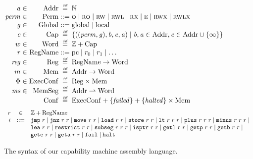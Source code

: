 \documentclass[format=acmsmall, review=true, screen=true]{acmart}
\newcommand{\parfun}{\rightharpoonup}
\newcommand{\var}[1]{\mathit{#1}}
\newcommand{\hs}{\var{ms}}
\newcommand{\ms}{\hs}
\newcommand{\hv}{\var{r}}
\newcommand{\rv}{\var{r}}
\newcommand{\lv}{\var{r}}
\newcommand{\gl}{\var{g}}
\newcommand{\pcreg}{\mathrm{pc}}
\newcommand{\addr}{\var{a}}
\newcommand{\start}{\var{b}}
\newcommand{\addrend}{\var{e}}
\newcommand{\reg}{\var{reg}}
\newcommand{\perm}{\var{perm}}
\newcommand{\failed}{\mathit{failed}}
\newcommand{\halted}{\mathit{halted}}
\newcommand{\plaindom}[1]{\mathrm{#1}}
\newcommand{\Caps}{\plaindom{Cap}}
\newcommand{\Words}{\plaindom{Word}}
\newcommand{\Addrs}{\plaindom{Addr}}
\newcommand{\ExecConfs}{\plaindom{ExecConf}}
\newcommand{\RegName}{\plaindom{RegName}}
\newcommand{\Regs}{\plaindom{Reg}}
\newcommand{\Heaps}{\plaindom{Mem}}
\newcommand{\HeapSegments}{\plaindom{MemSeg}}
\newcommand{\MemSegments}{\HeapSegments}
\newcommand{\Confs}{\plaindom{Conf}}
\newcommand{\nats}{\mathbb{N}}
\newcommand{\ints}{\mathbb{Z}}
\newcommand{\Perms}{\plaindom{Perm}}
\newcommand{\Globals}{\plaindom{Global}}
\newcommand{\zinstr}[1]{\mathtt{#1}}
\newcommand{\fail}{\zinstr{fail}}
\newcommand{\halt}{\zinstr{halt}}
\newcommand{\oneinstr}[2]{
  \ifthenelse{\equal{#2}{}}
  {\zinstr{#1}}
  {\zinstr{#1} \; #2}
}
\newcommand{\jmp}[1]{\oneinstr{jmp}{#1}}
\newcommand{\twoinstr}[3]{
  \ifthenelse{\equal{#2#3}{}}
  {\zinstr{#1}}
  {\zinstr{#1} \; #2 \; #3}
}
\newcommand{\restricttwo}[2]{\twoinstr{restrict}{#1}{#2}}
\newcommand{\jnz}[2]{\twoinstr{jnz}{#1}{#2}}
\newcommand{\isptr}[2]{\twoinstr{isptr}{#1}{#2}}
\newcommand{\geta}[2]{\twoinstr{geta}{#1}{#2}}
\newcommand{\getb}[2]{\twoinstr{getb}{#1}{#2}}
\newcommand{\gete}[2]{\twoinstr{gete}{#1}{#2}}
\newcommand{\getp}[2]{\twoinstr{getp}{#1}{#2}}
\newcommand{\getl}[2]{\twoinstr{getl}{#1}{#2}}
\newcommand{\move}[2]{\twoinstr{move}{#1}{#2}}
\newcommand{\store}[2]{\twoinstr{store}{#1}{#2}}
\newcommand{\load}[2]{\twoinstr{load}{#1}{#2}}
\newcommand{\lea}[2]{\twoinstr{lea}{#1}{#2}}
\newcommand{\threeinstr}[4]{
  \ifthenelse{\equal{#2#3#4}{}}
  {\zinstr{#1}}
  {\zinstr{#1} \; #2 \; #3 \; #4}
}
\newcommand{\subseg}[3]{\threeinstr{subseg}{#1}{#2}{#3}}
\newcommand{\plus}[3]{\threeinstr{plus}{#1}{#2}{#3}}
\newcommand{\minus}[3]{\threeinstr{minus}{#1}{#2}{#3}}
\newcommand{\lt}[3]{\threeinstr{lt}{#1}{#2}{#3}}
\newcommand{\plainperm}[1]{\textsc{#1}}
\newcommand{\noperm}{\plainperm{o}}
\newcommand{\readonly}{\plainperm{ro}}
\newcommand{\readwrite}{\plainperm{rw}}
\newcommand{\exec}{\plainperm{rx}}
\newcommand{\entry}{\plainperm{e}}
\newcommand{\rwx}{\plainperm{rwx}}
\newcommand{\readwritel}{\plainperm{rwl}}
\newcommand{\rwlx}{\plainperm{rwlx}}
\newcommand{\plainlocality}[1]{\mathrm{#1}}
\newcommand{\local}{\plainlocality{local}}
\newcommand{\glob}{\plainlocality{global}}
\newcommand{\isdef}{\mathrel{\overset{\makebox[0pt]{\mbox{\normalfont\tiny\sffamily def}}}{=}}}
\newcommand\bnfdef{\mathrel{::=}}
\begin{document}
\begin{figure}[b]
\[\arraycolsep=1.4pt
  \begin{array}{rlrcl}
    \addr   &\in& \Addrs &\isdef& \nats \\
    \perm   &\in& \Perms &::= & \noperm \mid \readonly\mid \readwrite\mid \readwritel\mid\exec\mid \entry\mid \rwx\mid \rwlx  \\
    \gl&\in&\Globals & ::= &\glob \mid \local \\
    c &\in& \Caps  &\isdef & \left\{
                         ((\perm,\gl),\start,\addrend,\addr)\mid
                         \start,\addr\in\Addrs,\addrend \in
                         \Addrs\cup \{\infty\}\right\}\\
    w &\in&\Words &\isdef& \ints + \Caps \\
    r    &\in & \RegName     &\bnfdef& \pcreg\mid r_0\mid r_1\mid\ldots\\
    \reg &\in & \Regs        &\isdef& \RegName \rightarrow \Words \\
    m    &\in & \Heaps       &\isdef& \Addrs \rightarrow \Words \\
    \Phi &\in & \ExecConfs   &\isdef& \Regs \times \Heaps \\
    \ms  &\in & \MemSegments &\isdef& \Addrs \parfun \Words \\
    &&\Confs &\isdef& \ExecConfs + \{\failed \} + \{\halted\} \times \Heaps
  \end{array}
\]
  \begin{equation*}
  \begin{array}{rcl}
    \rv    &\in& \ints + \RegName \\
    i      &::=& 
                 \jmp{\lv} \mid 
                 \jnz{\lv}{\rv} \mid
                 \move{\lv}{\rv} \mid 
                 \load{\lv}{\hv} \mid 
                 \store{\hv}{\rv} \mid
                 \lt{\lv}{\rv}{\rv} \mid
                 \plus{\lv}{\rv}{\rv} \mid 
                 \minus{\lv}{\rv}{\rv} \mid \\
          &   &  \lea{\lv}{\rv} \mid 
                 \restricttwo{\lv}{\rv} \mid
                 \subseg{\lv}{\rv}{\rv} \mid  
                 \isptr{\lv}{\rv} \mid 
                 \getl{\lv}{\lv} \mid
                 \getp{\lv}{\lv} \mid
                 \getb{\lv}{\lv} \mid\\
          &   &  \gete{\lv}{\lv} \mid 
                 \geta{\lv}{\lv} \mid 
                 \fail \mid
                 \halt 
  \end{array}
\end{equation*}
  \caption{The syntax of our capability machine assembly language.}
  \label{fig:syntax}
\end{figure}
\end{document}
